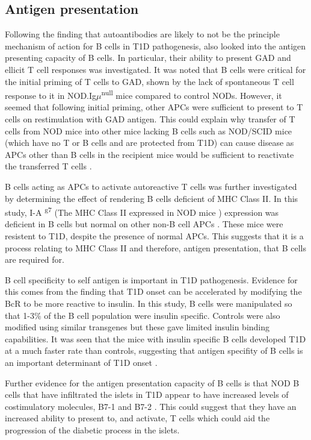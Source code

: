 \subsection{Antigen presentation}


Following the finding that autoantibodies are likely to not be the principle mechanism of action for B cells in T1D pathogenesis, \citet{Serreze1998} also looked into the antigen presenting capacity of B cells.
In particular, their ability to present GAD and ellicit T cell responses was investigated.
It was noted that B cells were critical for the initial priming of T cells to GAD, shown by the lack of spontaneous T cell response to it in NOD.Ig$\mu$\textsuperscript{null} mice compared to control NODs.
However, it seemed that following initial priming, other APCs were sufficient to present to T cells on restimulation with GAD antigen.
This could explain why transfer of T cells from NOD mice into other mice lacking B cells such as NOD/SCID mice (which have no T or B cells and are protected from T1D) can cause disease as APCs other than B cells in the recipient mice would be sufficient to reactivate the transferred T cells \citep{Charlton2001}.

B cells acting as APCs to activate autoreactive T cells was further investigated by determining the effect of rendering B cells deficient of MHC Class II.
In this study, I-A\textsuperscript{
g7} (The MHC Class II expressed in NOD mice \citep{Stratmann2000}) expression was deficient in B cells but normal on other non-B cell APCs \citep{Noorchashm1999}.
These mice were resistent to T1D, despite the presence of normal APCs. 
This suggests that it is a process relating to MHC Class II and therefore, antigen presentation, that B cells are required for.


B cell specificity to self antigen is important in T1D pathogenesis.
Evidence for this comes from the finding that T1D onset can be accelerated by modifying the BcR to be more reactive to insulin.
In this study, B cells were manipulated so that 1-3\% of the B cell population were insulin specific.
Controls were also modified using similar transgenes but these gave limited insulin binding capabilities.
It was seen that the mice with insulin specific B cells developed T1D at a much faster rate than controls, suggesting that antigen specifity of B cells is an important determinant of T1D onset \citep{Hulbert2001}.

Further evidence for the antigen presentation capacity of B cells is that NOD B cells that have infiltrated the islets in T1D appear to have increased levels of costimulatory molecules, B7-1 and B7-2 \citep{Hussain2005}. 
This could suggest that they have an increased ability to present to, and activate, T cells which could aid the progression of the diabetic process in the islets.

